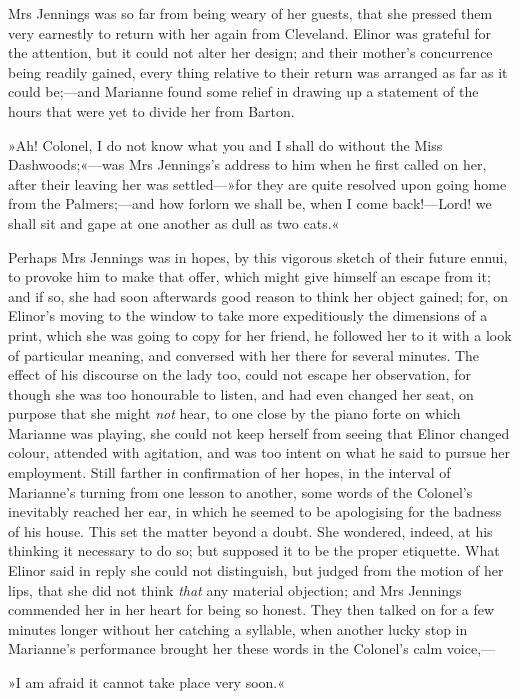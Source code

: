 Mrs Jennings was so far from being weary of her guests, that she pressed them very earnestly to return with her again from Cleveland. Elinor was grateful for the attention, but it could not alter her design; and their mother’s concurrence being readily gained, every thing relative to their return was arranged as far as it could be;—and Marianne found some relief in drawing up a statement of the hours that were yet to divide her from Barton.

»Ah! Colonel, I do not know what you and I shall do without the Miss Dashwoods;«—was Mrs Jennings’s address to him when he first called on her, after their leaving her was settled—»for they are quite resolved upon going home from the Palmers;—and how forlorn we shall be, when I come back!—Lord! we shall sit and gape at one another as dull as two cats.«

Perhaps Mrs Jennings was in hopes, by this vigorous sketch of their future ennui, to provoke him to make that offer, which might give himself an escape from it; and if so, she had soon afterwards good reason to think her object gained; for, on Elinor’s moving to the window to take more expeditiously the dimensions of a print, which she was going to copy for her friend, he followed her to it with a look of particular meaning, and conversed with her there for several minutes. The effect of his discourse on the lady too, could not escape her observation, for though she was too honourable to listen, and had even changed her seat, on purpose that she might \textit{not} hear, to one close by the piano forte on which Marianne was playing, she could not keep herself from seeing that Elinor changed colour, attended with agitation, and was too intent on what he said to pursue her employment. Still farther in confirmation of her hopes, in the interval of Marianne’s turning from one lesson to another, some words of the Colonel’s inevitably reached her ear, in which he seemed to be apologising for the badness of his house. This set the matter beyond a doubt. She wondered, indeed, at his thinking it necessary to do so; but supposed it to be the proper etiquette. What Elinor said in reply she could not distinguish, but judged from the motion of her lips, that she did not think \textit{that} any material objection; and Mrs Jennings commended her in her heart for being so honest. They then talked on for a few minutes longer without her catching a syllable, when another lucky stop in Marianne’s performance brought her these words in the Colonel’s calm voice,—

»I am afraid it cannot take place very soon.«

